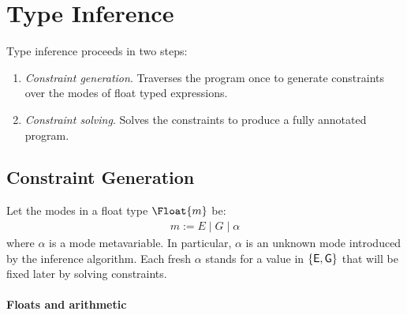 \section{Type Inference}
Type inference proceeds in two steps: 

\begin{enumerate}
    \item \textit{Constraint generation}. Traverses the program once to generate constraints over the modes of float typed expressions.
    \item \textit{Constraint solving}. Solves the constraints to produce a fully annotated program.
\end{enumerate}

\subsection{Constraint Generation}
Let the modes in a float type $\Float{m}$ be:
\begin{align*}
    m := E \mid G \mid \alpha
\end{align*}
where $\alpha$ is a mode metavariable. In particular, $\alpha$ is an unknown mode introduced by the inference algorithm. Each fresh $\alpha$ stands for a value in $\{\mathsf{E}, \mathsf{G}\}$ that will be fixed later by solving constraints.

\paragraph{Floats and arithmetic}


